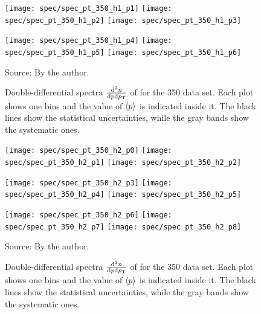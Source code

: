 \begin{figure}[!ht]
  \centering

  \texttt{[image: spec/spec\_pt\_350\_h1\_p1]}
  \texttt{[image: spec/spec\_pt\_350\_h1\_p2]}
  \texttt{[image: spec/spec\_pt\_350\_h1\_p3]}

  \texttt{[image: spec/spec\_pt\_350\_h1\_p4]}
  \texttt{[image: spec/spec\_pt\_350\_h1\_p5]}
  \texttt{[image: spec/spec\_pt\_350\_h1\_p6]}

  \caption{Double-differential spectra $\frac{\text{d}^2n}{\text{d}p\text{d}p_\text{T}}$
    of \antilamb for the 350 \GeVc data set. Each plot shows one \pp bins and the value
    of $\langle p\rangle$ is indicated inside it. The black lines show the statistical
    uncertainties, while the gray bands show the systematic ones.}
  \label{fig:hadron:spec:vzero:all350:h1}
  \begin{center}
    \small Source: By the author. 
  \end{center}
\end{figure}


\begin{figure}[!ht]
  \centering

  \texttt{[image: spec/spec\_pt\_350\_h2\_p0]}
  \texttt{[image: spec/spec\_pt\_350\_h2\_p1]}
  \texttt{[image: spec/spec\_pt\_350\_h2\_p2]}
  
  \texttt{[image: spec/spec\_pt\_350\_h2\_p3]}
  \texttt{[image: spec/spec\_pt\_350\_h2\_p4]}
  \texttt{[image: spec/spec\_pt\_350\_h2\_p5]}

  \texttt{[image: spec/spec\_pt\_350\_h2\_p6]}
  \texttt{[image: spec/spec\_pt\_350\_h2\_p7]}
  \texttt{[image: spec/spec\_pt\_350\_h2\_p8]}

  \caption{Double-differential spectra $\frac{\text{d}^2n}{\text{d}p\text{d}p_\text{T}}$
    of \kzeros for the 350 \GeVc data set. Each plot shows one \pp bins and the value
    of $\langle p\rangle$ is indicated inside it. The black lines show the statistical
    uncertainties, while the gray bands show the systematic ones.}
  \label{fig:hadron:spec:vzero:all350:h2}
  \begin{center}
    \small Source: By the author. 
  \end{center}
\end{figure}
